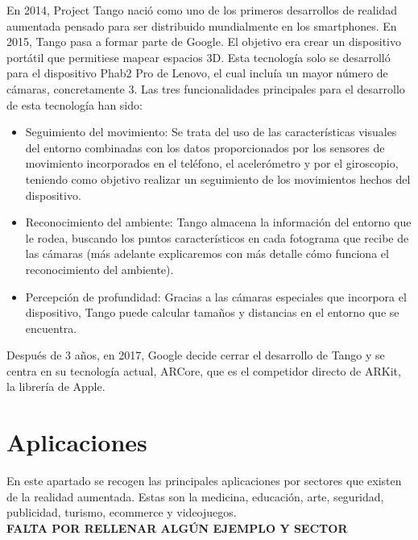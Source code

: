 En 2014, Project Tango nació como uno de los primeros desarrollos de realidad aumentada pensado para ser distribuido mundialmente en los smartphones. En 2015, Tango pasa a formar parte de Google. El objetivo era crear un dispositivo portátil que permitiese mapear espacios 3D. Esta tecnología solo se desarrolló para el dispositivo Phab2 Pro de Lenovo, el cual incluía un mayor número de cámaras, concretamente 3.
Las tres funcionalidades principales para el desarrollo de esta tecnología han sido:
\begin{itemize}
\item Seguimiento del movimiento: Se trata del uso de las características visuales del entorno combinadas con los datos proporcionados por los sensores de movimiento incorporados en el teléfono, el acelerómetro y por el giroscopio, teniendo como objetivo realizar un seguimiento de los movimientos hechos del dispositivo. 
\item Reconocimiento del ambiente: Tango almacena la información del entorno que le rodea, buscando los puntos característicos en cada fotograma que recibe de las cámaras (más adelante explicaremos con más detalle cómo funciona el reconocimiento del ambiente).
\item Percepción de profundidad: Gracias a las cámaras especiales que incorpora el dispositivo, Tango puede calcular tamaños y distancias en el entorno que se encuentra. 
\end{itemize}
Después de 3 años, en 2017, Google decide cerrar el desarrollo de Tango y se centra en su tecnología actual, ARCore, que es el competidor directo de ARKit, la librería de Apple.


\section{Aplicaciones}
En este apartado se recogen las principales aplicaciones por sectores que existen de la realidad aumentada. Estas son la medicina, educación, arte, seguridad, publicidad, turismo, ecommerce y videojuegos.\\
\textbf{FALTA POR RELLENAR ALGÚN EJEMPLO Y SECTOR} 
